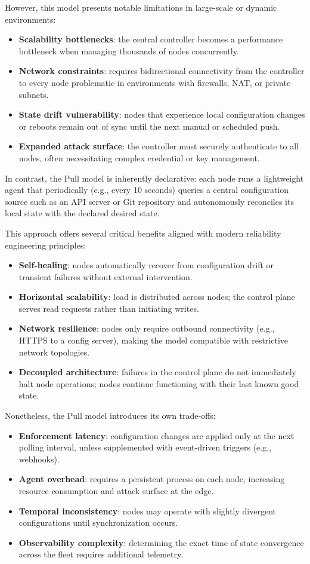 However, this model presents notable limitations in large-scale or dynamic environments:
\begin{itemize}
\item \textbf{Scalability bottlenecks}: the central controller becomes a performance bottleneck when managing thousands of nodes concurrently.
\item \textbf{Network constraints}: requires bidirectional connectivity from the controller to every node problematic in environments with firewalls, NAT, or private subnets.
\item \textbf{State drift vulnerability}: nodes that experience local configuration changes or reboots remain out of sync until the next manual or scheduled push.
\item \textbf{Expanded attack surface}: the controller must securely authenticate to all nodes, often necessitating complex credential or key management.
\end{itemize}

In contrast, the Pull model is inherently declarative: each node runs a lightweight agent that periodically (e.g., every 10 seconds) queries a central configuration source such as an API server or Git repository and autonomously reconciles its local state with the declared desired state.

This approach offers several critical benefits aligned with modern reliability engineering principles:
\begin{itemize}
    \item \textbf{Self-healing}: nodes automatically recover from configuration drift or transient failures without external intervention.
    \item \textbf{Horizontal scalability}: load is distributed across nodes; the control plane serves read requests rather than initiating writes.
    \item \textbf{Network resilience}: nodes only require outbound connectivity (e.g., HTTPS to a config server), making the model compatible with restrictive network topologies.
    \item \textbf{Decoupled architecture}: failures in the control plane do not immediately halt node operations; nodes continue functioning with their last known good state.
\end{itemize}

Nonetheless, the Pull model introduces its own trade-offs:
\begin{itemize}
    \item \textbf{Enforcement latency}: configuration changes are applied only at the next polling interval, unless supplemented with event-driven triggers (e.g., webhooks).
    \item \textbf{Agent overhead}: requires a persistent process on each node, increasing resource consumption and attack surface at the edge.
    \item \textbf{Temporal inconsistency}: nodes may operate with slightly divergent configurations until synchronization occurs.
    \item \textbf{Observability complexity}: determining the exact time of state convergence across the fleet requires additional telemetry.
\end{itemize}

